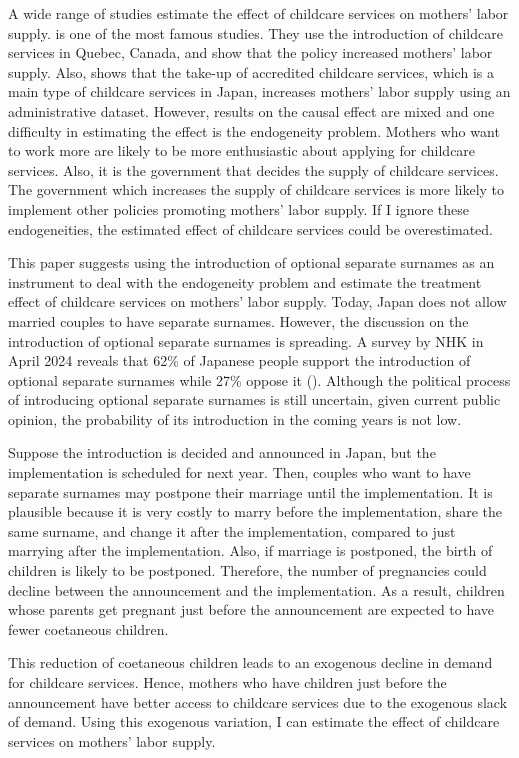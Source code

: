 \documentclass[12pt]{article}
\begin{document}
A wide range of studies estimate the effect of childcare services on mothers' labor supply.
\cite{Baker2008-vt} is one of the most famous studies. 
They use the introduction of childcare services in Quebec, Canada, and show that the policy increased mothers' labor supply.
Also, \cite{kondo2024} shows that the take-up of accredited childcare services, which is a main type of childcare services in Japan, increases mothers' labor supply using an administrative dataset.
However, results on the causal effect are mixed and one difficulty in estimating the effect is the endogeneity problem.
Mothers who want to work more are likely to be more enthusiastic about applying for childcare services.
Also, it is the government that decides the supply of childcare services. 
The government which increases the supply of childcare services is more likely to implement other policies promoting mothers' labor supply.
If I ignore these endogeneities, the estimated effect of childcare services could be overestimated.


This paper suggests using the introduction of optional separate surnames as an instrument to deal with the endogeneity problem and estimate the treatment effect of childcare services on mothers' labor supply.
Today, Japan does not allow married couples to have separate surnames.
However, the discussion on the introduction of optional separate surnames is spreading.
A survey by NHK in April 2024 reveals that 62\% of Japanese people support the introduction of optional separate surnames while 27\% oppose it (\cite{nhk}).
Although the political process of introducing optional separate surnames is still uncertain, given current public opinion, the probability of its introduction in the coming years is not low.


Suppose the introduction is decided and announced in Japan, but the implementation is scheduled for next year.
Then, couples who want to have separate surnames may postpone their marriage until the implementation. 
It is plausible because it is very costly to marry before the implementation, share the same surname, and change it after the implementation, compared to just marrying after the implementation.
Also, if marriage is postponed, the birth of children is likely to be postponed.
Therefore, the number of pregnancies could decline between the announcement and the implementation.
As a result, children whose parents get pregnant just before the announcement are expected to have fewer coetaneous children.


This reduction of coetaneous children leads to an exogenous decline in demand for childcare services.
Hence, mothers who have children just before the announcement have better access to childcare services due to the exogenous slack of demand.
Using this exogenous variation, I can estimate the effect of childcare services on mothers' labor supply. 
\end{document}
